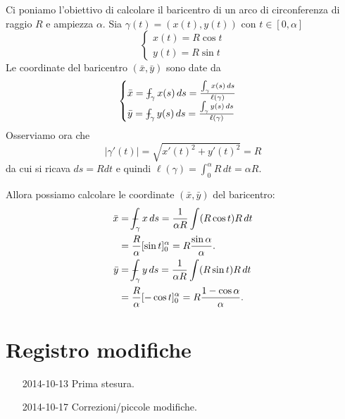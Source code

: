 \documentclass[italian,a4paper,hidelinks]{scrartcl}
\newcommand{\defeq}{=}
\def\Xint#1{\mathchoice
{\XXint\displaystyle\textstyle{#1}}%
{\XXint\textstyle\scriptstyle{#1}}%
{\XXint\scriptstyle\scriptscriptstyle{#1}}%
{\XXint\scriptscriptstyle\scriptscriptstyle{#1}}%
\!\int}
\def\XXint#1#2#3{{\setbox0=\hbox{$#1{#2#3}{\int}$ }
\vcenter{\hbox{$#2#3$ }}\kern-.6\wd0}}
\def\dashint{\Xint-}
\begin{document}
\begin{exercise}
Ci poniamo l'obiettivo di calcolare il baricentro di un arco di
circonferenza di raggio $R$ e ampiezza $\alpha$.
Sia $\gamma(t) = (x(t),y(t))$ con $t\in [0,\alpha]$
\[
\begin{cases}
x(t) = R \cos t \\
y(t) = R \sin t
\end{cases}
\]
Le coordinate del baricentro $(\bar x, \bar y)$ sono date da
\[
\begin{cases}
\bar x = \dashint_\gamma x(s)\, ds \defeq \frac{\int_\gamma x(s)\, ds}{\ell(\gamma)}\\
\bar y = \dashint_\gamma y(s)\, ds \defeq \frac{\int_\gamma y(s)\, ds}{\ell(\gamma)}
\end{cases}
\]
Osserviamo ora che
\[
  \lvert \gamma'(t)\rvert = \sqrt{ x'(t)^2 + y'(t)^2}
  = R
\]
da cui si ricava $ds = R dt$ e quindi
$\ell(\gamma) = \int_0^\alpha R\, dt = \alpha R$.

Allora possiamo calcolare le coordinate $(\bar x,\bar y)$ del baricentro:
\begin{align*}
\bar x & = \dashint_\gamma x\, ds =
\frac{1}{\alpha R} \int (R\cos t) R\, dt \\
& =
\frac{R}{\alpha}[\sin t]_0^\alpha
= R \frac{\sin \alpha}{\alpha}.\\
\bar y &= \dashint_\gamma y\, ds =
\frac{1}{\alpha R} \int (R\sin t) R\, dt \\
& = \frac{R}{\alpha} [-\cos t]_0^\alpha
 = R\frac{1-\cos \alpha}{\alpha}.
\end{align*}
\end{exercise}

\section{Registro modifiche}
\begin{itemize}
\item[2014-10-13] Prima stesura.
\item[2014-10-17] Correzioni/piccole modifiche.
\end{itemize}
\end{document}

